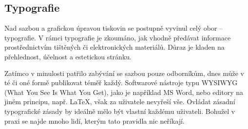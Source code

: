 \documentclass[a4paper, 11pt]{article}
\begin{document}
\subsection{Typografie}
Nad sazbou a grafickou úpravou tiskovin se postupně vyvinul celý obor -- typografie. V rámci typografie je zkoumáno, jak vhodně předávat informace prostřednictvím tištěných či elektronických materiálů. Důraz je kladen na přehlednost, účelnost a estetickou stránku.
\cite{OlsakTypo}

Zatímco v minulosti patřilo zabývání se sazbou pouze odborníkům, dnes může v té či oné formě publikovat téměř každý. Softwarové nástroje typu WYSIWYG (What You See Is What You Get), jako je například MS Word, nebo editory na jiném principu, např. \LaTeX, však za uživatele nevyřeší vše. Ovládat zásadní typografické zásady by ideálně mělo být vlastní každému uživateli. Bohužel v praxi se najde mnoho lidí, kterým tato pravidla nic neříkají. \cite{Olsak1996} \cite{Sirucek2006}

\newpage


\end{document}

